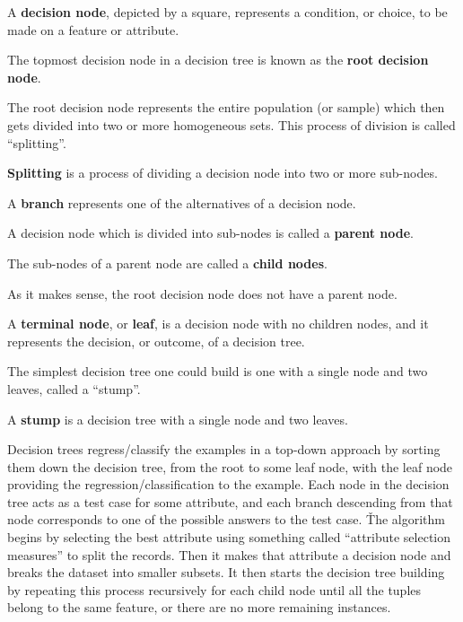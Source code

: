 A \textbf{decision node}, depicted by a square, represents a condition, or choice, to be made on a feature or attribute.
\ed

The topmost decision node in a decision tree is known as the \textbf{root decision node}.
\ed

The root decision node represents the entire population (or sample) which then gets divided into two or more homogeneous
sets. This process of division is called ``splitting''.

\bd[Splitting]
\textbf{Splitting} is a process of dividing a decision node into two or more sub-nodes.
\ed

\bd [Branch]
A \textbf{branch} represents one of the alternatives of a decision node.
\ed

A decision node which is divided into sub-nodes is called a \textbf{parent node}.
\ed

The sub-nodes of a parent node are called a \textbf{child nodes}.
\ed

As it makes sense, the root decision node does not have a parent node.

A \textbf{terminal node}, or \textbf{leaf}, is a decision node with no children nodes, and it represents the decision,
or outcome, of a decision tree.
\ed

\vspace{-5pt}


The simplest decision tree one could build is one with a single node and two leaves, called a ``stump''.

\bd[Stump]
A \textbf{stump} is a decision tree with a single node and two leaves.
\ed

Decision trees regress/classify the examples in a top-down approach by sorting them down the decision tree, from the
root to some leaf node, with the leaf node providing the regression/classification to the example. Each node in the
decision tree acts as a test case for some attribute, and each branch descending from that node corresponds to one
of the possible answers to the test case. \v

The algorithm begins by selecting the best attribute using something called ``attribute selection measures'' to
split the records. Then it makes that attribute a decision node and breaks the dataset into smaller subsets. It then
starts the decision tree building by repeating this process recursively for each child node until all the tuples
belong to the same feature, or there are no more remaining instances.

